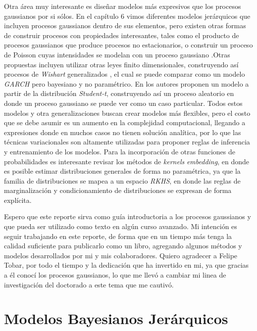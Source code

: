 Otra área muy interesante es dise\~{n}ar modelos más expresivos que los procesos gaussianos por si sólos. En el capítulo 6 vimos diferentes modelos jerárquicos que incluyen procesos gaussianos dentro de sus elementos, pero existen otras formas de construir procesos con propiedades interesantes, tales como el producto de procesos gaussianos \cite{60} que produce procesos no estacionarios, o construir un proceso de Poisson cuyas intensidades se modelan con un proceso gaussiano \cite{65}.Otras propuestas incluyen utilizar otras leyes finito dimensionales, construyendo así procesos de \emph{Wishart }generalizados \cite{56}, el cual se puede comparar como un modelo \emph{GARCH} pero bayesiano y no paramétrico. En \cite{66} los autores proponen un modelo a partir de la distribución \emph{Student-t}, construyendo así un proceso
aleatorio en donde un proceso gaussiano se puede ver como un caso particular. Todos estos modelos y otra generalizaciones buscan crear modelos más flexibles, pero el costo que se debe asumir es un aumento en la complejidad computacional, llegando a expresiones donde en muchos casos no tienen solución analítica, por lo que las técnicas variacionales son altamente utilizadas para proponer reglas de inferencia y
entrenamiento de los modelos. Para la incorporación de otras funciones de probabilidades es interesante revisar los métodos de \emph{kernels} \emph{embedding}\cite{8}\cite{9}\cite{10}\cite{11}, en donde es posible estimar distribuciones generales de forma no paramétrica, ya que la familia de distribuciones se mapea a un espacio \emph{RKHS}, en donde las reglas de marginalización y condicionamiento de distribuciones se expresan de forma explícita.

Espero que este reporte sirva como guía introductoria a los procesos gaussianos y que pueda ser utilizado como texto en algún curso avanzado. Mi intención es seguir trabajando en este reporte, de forma que en un tiempo más tenga la calidad suficiente para publicarlo como un libro, agregando algunos métodos y modelos desarrollados por mi y mis colaboradores. Quiero agradecer a Felipe Tobar, por todo el tiempo y la dedicación que ha invertido en mi, ya que gracias a él conocí los procesos gaussianos, lo que me llevó a cambiar mi linea de investigación del doctorado a este tema que me cautivó.


\section{Modelos Bayesianos Jerárquicos}

